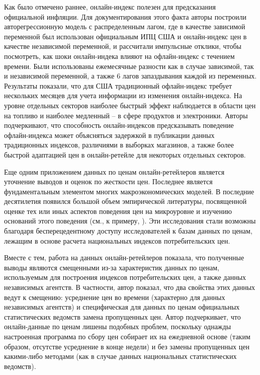 Как было отмечено раннее, онлайн-индекс полезен для предсказания официальной инфляции. Для документирования этого факта авторы построили авторегрессионную модель с распределенным лагом, где в качестве зависимой переменной был использован официальным ИПЦ США и онлайн-индекс цен в качестве независимой переменной, и рассчитали импульсные отклики, чтобы посмотреть, как шоки онлайн-индека влияют на офлайн-индекс с течением времени. Были использованы ежемесячные разности как в случае зависимой, так и независимой переменной, а также 6 лагов запаздывания каждой из переменных. Результаты показали, что для США традиционный офлайн-индекс требует нескольких месяцев для учета информации из изменения онлайн-индекса. На уровне отдельных секторов наиболее быстрый эффект наблюдается в области цен на топливо и наиболее медленный – в сфере продуктов и электроники. Авторы подчеркивают, что способность онлайн-индексов предсказывать поведение офлайн-индекса может объясняться задержкой в публикации данных традиционных индексов, различиями в выборках магазинов, а также более быстрой адаптацией цен в онлайн-ретейле для некоторых отдельных секторов. 

Еще одним приложением данных по ценам онлайн-ретейлеров является уточнение выводов и оценок по жесткости цен. Последнее является фундаментальным элементом многих макроэкономических моделей. В последние десятилетия появился большой объем эмпирической литературы, посвященной оценке тех или иных аспектов поведения цен на микроуровне и изучению оснований этого поведения (см., к примеру, \cite{bils2004some,KlenowKryvtsov2008,gagnon2009}). Эти исследования стали возможны благодаря бесперецедентному доступу исследователей к базам данных по ценам, лежащим в основе расчета национальных индексов потребительских цен.

Вместе с тем, работа \cite{cavallo2018scraped} на данных онлайн-ретейлеров показала, что полученные выводы являются смещенными из-за характеристик данных по ценам, используемым для построения индексов потребительских цен, а также данных независимых агентств. В частности, автор показал, что два свойства этих данных ведут к смещению: усреднение цен во времени (характерно для данных независимых агентств) и специфическая для данных по ценам официальных статистических ведомств замена пропущенных цен. Автор подчеркивает, что онлайн-данные по ценам лишены подобных проблем, поскольку однажды настроенная программа по сбору цен собирает их на ежедневной основе (таким образом, отсутстве усреднение в конце недели) и без замены пропущенных цен какими-либо методами (как в случае данных национальных статистических ведомств).

